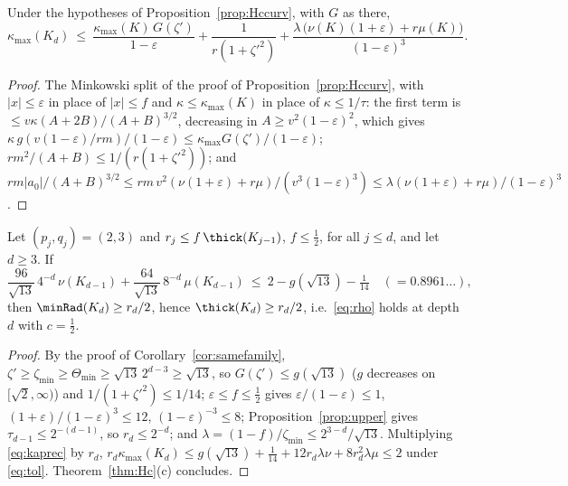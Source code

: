\begin{proposition}\label{prop:curvrec}
Under the hypotheses of Proposition~\ref{prop:Hccurv}, with $G$ as there,
\begin{equation}\label{eq:kaprec}
\kappa_{\max}(K_d)\ \le\ \frac{\kappa_{\max}(K)\,G(\zeta')}{1-\varepsilon}+\frac1{r(1+\zeta'^2)}+\frac{\lambda\,\bigl(\nu(K)(1+\varepsilon)+r\mu(K)\bigr)}{(1-\varepsilon)^3}.
\end{equation}
\end{proposition}
\begin{proof}
The Minkowski split of the proof of Proposition~\ref{prop:Hccurv}, with $|x|\le\varepsilon$ in place of $|x|\le f$ and $\kappa\le\kappa_{\max}(K)$ in place of $\kappa\le1/\tau$: the first term is $\le v\kappa(A+2B)/(A+B)^{3/2}$, decreasing in $A\ge v^2(1-\varepsilon)^2$, which gives $\kappa\,g(v(1-\varepsilon)/rm)/(1-\varepsilon)\le\kappa_{\max}G(\zeta')/(1-\varepsilon)$; $rm^2/(A+B)\le1/(r(1+\zeta'^2))$; and $rm|a_0|/(A+B)^{3/2}\le rm\,v^2(\nu(1+\varepsilon)+r\mu)/(v^3(1-\varepsilon)^3)\le\lambda(\nu(1+\varepsilon)+r\mu)/(1-\varepsilon)^3$.
\end{proof}

\begin{corollary}\label{cor:tolerance}
Let $(p_j,q_j)=(2,3)$ and $r_j\le f\,\thick(K_{j-1})$, $f\le\frac12$, for all $j\le d$, and let $d\ge3$. If
\begin{equation}\label{eq:tol}
\frac{96}{\sqrt{13}}\,4^{-d}\,\nu(K_{d-1})+\frac{64}{\sqrt{13}}\,8^{-d}\,\mu(K_{d-1})\ \le\ 2-g(\sqrt{13})-\tfrac1{14}\quad(=0.8961\ldots),
\end{equation}
then $\minRad(K_d)\ge r_d/2$, hence $\thick(K_d)\ge r_d/2$, i.e.\ \eqref{eq:rho} holds at depth $d$ with $c=\frac12$.
\end{corollary}
\begin{proof}
By the proof of Corollary~\ref{cor:samefamily}, $\zeta'\ge\zeta_{\min}\ge\Theta_{\min}\ge\sqrt{13}\,2^{d-3}\ge\sqrt{13}$, so $G(\zeta')\le g(\sqrt{13})$ ($g$ decreases on $[\sqrt2,\infty)$) and $1/(1+\zeta'^2)\le1/14$; $\varepsilon\le f\le\frac12$ gives $\varepsilon/(1-\varepsilon)\le1$, $(1+\varepsilon)/(1-\varepsilon)^3\le12$, $(1-\varepsilon)^{-3}\le8$; Proposition~\ref{prop:upper} gives $\tau_{d-1}\le2^{-(d-1)}$, so $r_d\le2^{-d}$; and $\lambda=(1-f)/\zeta_{\min}\le2^{3-d}/\sqrt{13}$. Multiplying \eqref{eq:kaprec} by $r_d$, $r_d\kappa_{\max}(K_d)\le g(\sqrt{13})+\frac1{14}+12r_d\lambda\nu+8r_d^2\lambda\mu\le2$ under \eqref{eq:tol}. Theorem~\ref{thm:Hc}(c) concludes.
\end{proof}

